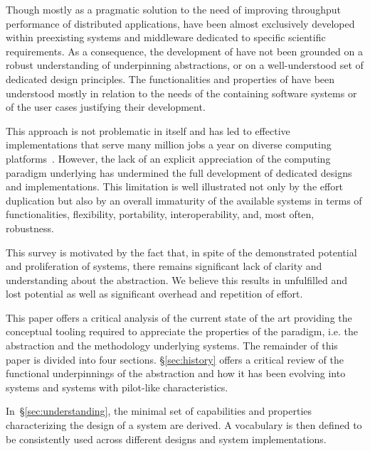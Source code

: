 \documentclass{sig-alternate}
\begin{document}


Though mostly as a pragmatic solution to the need of improving throughput
performance of distributed applications, \pilotjobs have been almost exclusively
developed within preexisting systems and middleware dedicated to specific
scientific requirements. As a consequence, the development of \pilotjobs have
not been grounded on a robust understanding of underpinning abstractions, or on
a well-understood set of dedicated design principles. The functionalities and
properties of \pilotjobs have been understood mostly in relation to the needs of
the containing software systems or of the user cases justifying their
development.

This approach is not problematic in itself and has led to effective
implementations that serve many million jobs a year on diverse computing
platforms~\cite{maeno2014evolution,katz2012}. However, the lack of an explicit
appreciation of the computing paradigm underlying \pilotjobs has undermined the
full development of dedicated designs and implementations. This limitation is
well illustrated not only by the effort duplication but also by an overall
immaturity of the available systems in terms of functionalities, flexibility,
portability, interoperability, and, most often, robustness.

This survey is motivated by the fact that, in spite of the demonstrated
potential and proliferation of \pilotjob systems, there remains significant lack
of clarity and understanding about the \pilotjob abstraction. We believe this
results in unfulfilled and lost potential as well as significant overhead and
repetition of effort.

This paper offers a critical analysis of the current state of the art providing
the conceptual tooling required to appreciate the properties of the \pilot
paradigm, i.e. the abstraction and the methodology underlying \pilotjobs
systems. The remainder of this paper is divided into four sections.
\S\ref{sec:history} offers a critical review of the functional underpinnings of
the \pilot abstraction and how it has been evolving into \pilotjob systems and
systems with pilot-like characteristics.

In~\S\ref{sec:understanding}, the minimal set of capabilities and properties
characterizing the design of a \pilotjob system are derived. A vocabulary is
then defined to be consistently used across different designs and
\pilotjob system implementations.
\end{document}
